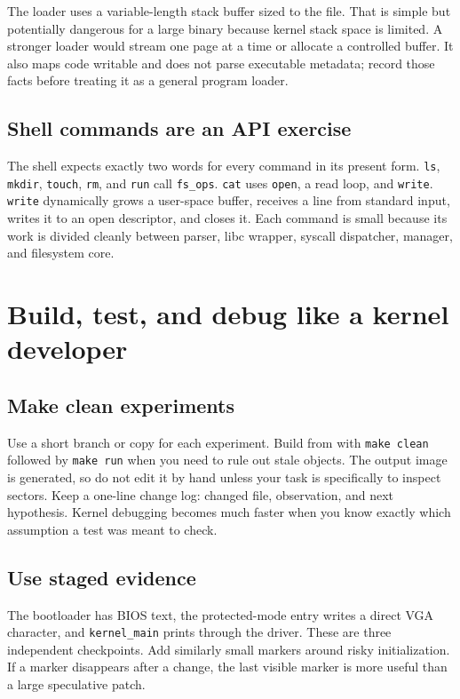 The loader uses a variable-length stack buffer sized to the file. That is simple but potentially dangerous for a large binary because kernel stack space is limited. A stronger loader would stream one page at a time or allocate a controlled buffer. It also maps code writable and does not parse executable metadata; record those facts before treating it as a general program loader.

\section{Shell commands are an API exercise}
The shell expects exactly two words for every command in its present form. \texttt{ls}, \texttt{mkdir}, \texttt{touch}, \texttt{rm}, and \texttt{run} call \texttt{fs\_ops}. \texttt{cat} uses \texttt{open}, a read loop, and \texttt{write}. \texttt{write} dynamically grows a user-space buffer, receives a line from standard input, writes it to an open descriptor, and closes it. Each command is small because its work is divided cleanly between parser, libc wrapper, syscall dispatcher, manager, and filesystem core.


\chapter{Build, test, and debug like a kernel developer}
\section{Make clean experiments}
Use a short branch or copy for each experiment. Build from  with \texttt{make clean} followed by \texttt{make run} when you need to rule out stale objects. The output image is generated, so do not edit it by hand unless your task is specifically to inspect sectors. Keep a one-line change log: changed file, observation, and next hypothesis. Kernel debugging becomes much faster when you know exactly which assumption a test was meant to check.

\section{Use staged evidence}
The bootloader has BIOS text, the protected-mode entry writes a direct VGA character, and \texttt{kernel\_main} prints through the driver. These are three independent checkpoints. Add similarly small markers around risky initialization. If a marker disappears after a change, the last visible marker is more useful than a large speculative patch.

